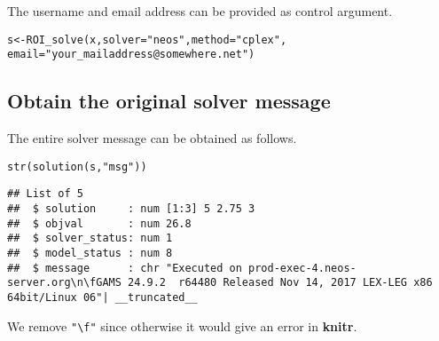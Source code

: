 \documentclass[a4paper]{article}\usepackage[]{graphicx}\usepackage[]{color}
\makeatletter
\newcommand{\hlstr}[1]{\textcolor[rgb]{0.741,0.553,0.545}{#1}}%
\newcommand{\hlstd}[1]{\textcolor[rgb]{0,0,0}{#1}}%
\newcommand{\hlkwb}[1]{\textcolor[rgb]{0.125,0.537,0.125}{#1}}%
\newcommand{\hlkwc}[1]{\textcolor[rgb]{0,0,1}{#1}}%
\newcommand{\hlkwd}[1]{\textcolor[rgb]{0,0,0}{#1}}%
\newenvironment{kframe}{%
 \def\at@end@of@kframe{}%
 \ifinner\ifhmode%
  \def\at@end@of@kframe{\end{minipage}}%
  \begin{minipage}{\columnwidth}%
 \fi\fi%
 \def\FrameCommand##1{\hskip\@totalleftmargin \hskip-\fboxsep
 \colorbox{shadecolor}{##1}\hskip-\fboxsep
     \hskip-\linewidth \hskip-\@totalleftmargin \hskip\columnwidth}%
 \MakeFramed {\advance\hsize-\width
   \@totalleftmargin\z@ \linewidth\hsize
   \@setminipage}}%
 {\par\unskip\endMakeFramed%
 \at@end@of@kframe}
\newenvironment{knitrout}{}{} %
\newcommand{\pkg}[1]{\textbf{#1}}
\makeatother
\begin{document}
The username and email address can be provided as control argument.

\begin{knitrout}
\color{fgcolor}\begin{kframe}
\begin{alltt}
\hlstd{s} \hlkwb{<-} \hlkwd{ROI_solve}\hlstd{(x,} \hlkwc{solver} \hlstd{=} \hlstr{"neos"}\hlstd{,} \hlkwc{method} \hlstd{=} \hlstr{"cplex"}\hlstd{,}
               \hlkwc{email} \hlstd{=} \hlstr{"your_mailaddress@somewhere.net"}\hlstd{)}
\end{alltt}
\end{kframe}
\end{knitrout}

\subsection{Obtain the original solver message}
The entire solver message can be obtained as follows.

\begin{knitrout}
\color{fgcolor}\begin{kframe}
\begin{alltt}
\hlkwd{str}\hlstd{(}\hlkwd{solution}\hlstd{(s,} \hlstr{"msg"}\hlstd{))}
\end{alltt}
\begin{verbatim}
## List of 5
##  $ solution     : num [1:3] 5 2.75 3
##  $ objval       : num 26.8
##  $ solver_status: num 1
##  $ model_status : num 8
##  $ message      : chr "Executed on prod-exec-4.neos-server.org\n\fGAMS 24.9.2  r64480 Released Nov 14, 2017 LEX-LEG x86 64bit/Linux 06"| __truncated__
\end{verbatim}
\end{kframe}
\end{knitrout}

We remove \verb+"\f"+ since otherwise it would give an error in \pkg{knitr}.
\end{document}
